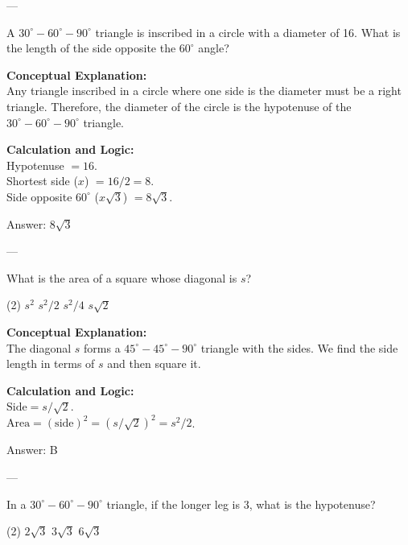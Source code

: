 \documentclass[11pt,paper=a4,answers]{exam}
\begin{document}
\begin{questions}
---

\question
A $30^\circ-60^\circ-90^\circ$ triangle is inscribed in a circle with a diameter of 16. What is the length of the side opposite the $60^\circ$ angle?

\begin{solution}
\textbf{Conceptual Explanation:} \\
Any triangle inscribed in a circle where one side is the diameter must be a right triangle. Therefore, the diameter of the circle is the hypotenuse of the $30^\circ-60^\circ-90^\circ$ triangle.

\vspace{10pt}
\textbf{Calculation and Logic:} \\
Hypotenuse $= 16$. \\
Shortest side ($x$) $= 16 / 2 = 8$. \\
Side opposite $60^\circ$ ($x\sqrt{3}$) $= 8\sqrt{3}$.

\vspace{15pt}
Answer: \colorbox{yellow!100}{$8\sqrt{3}$}
\end{solution}

---

\question
What is the area of a square whose diagonal is $s$?
\begin{tasks}(2)
    \task $s^2$
    \task $s^2/2$
    \task $s^2/4$
    \task $s\sqrt{2}$
\end{tasks}

\begin{solution}
\textbf{Conceptual Explanation:} \\
The diagonal $s$ forms a $45^\circ-45^\circ-90^\circ$ triangle with the sides. We find the side length in terms of $s$ and then square it.

\vspace{10pt}
\textbf{Calculation and Logic:} \\
$\text{Side} = s / \sqrt{2}$. \\
$\text{Area} = (\text{side})^2 = (s / \sqrt{2})^2 = s^2 / 2$.

\vspace{15pt}
Answer: \colorbox{yellow!100}{B}
\end{solution}

---

\question
In a $30^\circ-60^\circ-90^\circ$ triangle, if the longer leg is 3, what is the hypotenuse?
\begin{tasks}(2)
    \task $2\sqrt{3}$
    \task $3\sqrt{3}$
    \task $6\sqrt{3}$
\end{tasks}


\end{questions}
\end{document}
